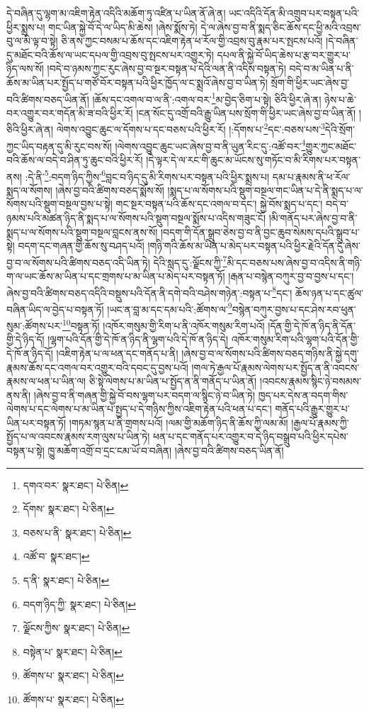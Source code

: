 དེ་བཞིན་དུ་ལྷག་མ་འཇིག་རྟེན་འདིའི་མཆོག་ཏུ་འཛིན་པ་ཡིན་ནོ་ཞེ་ན། ཡང་འདིའི་དོན་མི་འགྲུབ་པར་བསྟན་པའི་ཕྱིར་སྨྲས་པ། གང་ཡིན་སྐྱེ་བོ་དེ་ལ་ཡིད་མི་ཆེས། །ཞེས་སྨོས་ཏེ། དེ་ལ་ཞེས་བྱ་བ་ནི་སྨད་ཅིང་ཆོས་དང་ཕྱི་མའི་འབྲས་བུ་ལ་མི་ལྟ་བ་སྟེ། ཅི་ནས་ཀྱང་བསམ་པ་ཆོས་དང་འཇིག་རྟེན་ཕ་རོལ་གྱི་འབྲས་བུ་རྣམ་པར་སྤངས་པའོ། །དེ་བཞིན་དུ་མཐོང་བའི་ཆོས་ལ་ཡང་དཔལ་གྱི་འབྲས་བུ་སྤངས་པར་འགྱུར་ཏེ། དཔལ་ནི་སྐྱེ་བོ་ཡིད་ཆེས་པ་རྩ་བར་གྱུར་པ་ཉིད་ལས་སོ། །བདེ་བ་ཉམས་ཀྱང་རུང་ཞེས་བྱ་བ་སྔར་བསྟན་པ་དེའི་ལན་ནི་འདིས་བསྟན་ཏེ། བདེ་བ་མ་ཡིན་པ་ནི་ཆོས་མ་ཡིན་པར་སྤྱོད་པ་གཙོ་བོར་བསྟན་པའི་ཕྱིར་ཁྱོད་ལ་ང་སྨྲའོ་ཞེས་བྱ་བ་ཡིན་ཏེ། སྲོག་གི་ཕྱིར་ཡང་ཞེས་བྱ་བའི་ཚིགས་བཅད་ཡིན་ནོ། །ཆོས་དང་འགལ་བ་ལ་ནི་:འགལ་བར་\footnote{དགའ་བར་  སྣར་ཐང་།  པེ་ཅིན། }མ་བྱེད་ཅིག་པ་སྟེ། ཅིའི་ཕྱིར་ཞེ་ན། ཉེས་པ་ཆེ་བར་འགྱུར་བར་གདོན་མི་ཟ་བའི་ཕྱིར་རོ། །ངན་སོང་དུ་འགྲོ་བའི་རྒྱུ་ཡིན་པས་སྲོག་གི་ཕྱིར་ཡང་ཞེས་བྱ་བ་ཡིན་ནོ། །ཅིའི་ཕྱིར་ཞེ་ན། ལེགས་འབྱུང་ཆུང་ལ་དོགས་པ་དང་བཅས་པའི་ཕྱིར་རོ། །:དོགས་པ་\footnote{དོགས་  སྣར་ཐང་།  པེ་ཅིན། }དང་:བཅས་པས་\footnote{བཅས་པ་ནི་  སྣར་ཐང་།  པེ་ཅིན། }དེའི་སྲོག་ཀྱང་ཡིད་བརྟན་དུ་མི་རུང་བས་སོ། །ལེགས་འབྱུང་ཆུང་ཡང་ཞེས་བྱ་བ་ནི་ཡུན་རིང་དུ་:འཚོ་བར་\footnote{འཚོ་བ་  སྣར་ཐང་། }གྱུར་ཀྱང་མཐོང་བའི་ཆོས་ལ་བདེ་བ་ཤིན་ཏུ་ཆུང་བའི་ཕྱིར་རོ། །དེ་ལྟར་དེ་ལ་རང་གི་ཆུང་མ་ཡོངས་སུ་གཏོང་བ་མི་རིགས་པར་བསྟན་ནས། :དེ་ནི་\footnote{ད་ནི་  སྣར་ཐང་།  པེ་ཅིན། }:བདག་ཉིད་ཀྱིས་\footnote{བདག་ཉིད་ཀྱི་  སྣར་ཐང་།  པེ་ཅིན། }བླང་བ་ཉིད་དུ་མི་རིགས་པར་བསྟན་པའི་ཕྱིར་སྨྲས་པ། དམ་པ་རྣམས་ནི་ཕ་རོལ་སྨད་ལ་སོགས། །ཞེས་བྱ་བའི་ཚིགས་བཅད་སྨོས་སོ། །སྨད་པ་ལ་སོགས་པའི་སྡུག་བསྔལ་གང་ཡིན་པ་དེ་ནི་སྨད་པ་ལ་སོགས་པའི་སྡུག་བསྔལ་བྱས་པ་སྟེ། གང་སྔར་བསྟན་པའི་ཆོས་དང་འགལ་བ་དང་། སྐྱེ་བོས་སྨད་པ་དང་། བདེ་བ་ཉམས་པའི་མཚན་ཉིད་ནི་སྨད་པ་ལ་སོགས་པའི་སྡུག་བསྔལ་སྨོས་པ་འདིས་གཟུང་ངོ། །མི་གནོད་པར་ཞེས་བྱ་བ་ནི་སྨད་པ་ལ་སོགས་པའི་སྡུག་བསྔལ་བླངས་ནས་སོ། །བདག་གི་དོན་སྒྲུབ་ཅེས་བྱ་བ་ནི་བྱང་ཆུབ་སེམས་དཔའི་སྒྲུབ་པ་སྟེ། བདག་དང་གཞན་གྱི་ཆོས་སུ་བཤད་པའོ། །གཉི་གའི་ཆོས་མ་ཡིན་པ་མེད་པར་བསྟན་པའི་ཕྱིར་རྗེའི་དོན་དུ་ཞེས་བྱ་བ་ལ་སོགས་པའི་ཚིགས་བཅད་འདི་ཡིན་ཏེ། དེའི་སླད་དུ་:ལྗོངས་ཀྱི་\footnote{ལྗོངས་ཀྱིས་  སྣར་ཐང་།  པེ་ཅིན། }མི་དང་བཅས་པས་ཞེས་བྱ་བ་འདིས་ནི་གཉི་ག་ལ་ཡང་ཆོས་མ་ཡིན་པ་དང་གྲགས་པ་མ་ཡིན་པ་མེད་པར་བསྟན་ཏོ། །རྒན་པ་བསྙེན་བཀུར་བྱ་བ་བྱས་པ་དང་། ཞེས་བྱ་བའི་ཚིགས་བཅད་འདིའི་བསྡུས་པའི་དོན་ནི་དགེ་བའི་བཤེས་གཉེན་:བསྟན་པ་\footnote{བསྟེན་པ་  སྣར་ཐང་།  པེ་ཅིན། }དང་། ཆོས་ཉན་པ་དང་ཚུལ་བཞིན་ཡིད་ལ་བྱེད་པ་བསྟན་ཏོ། །ཡང་ན་བླ་མ་དང་དམ་པའི་:ཚོགས་ལ་\footnote{ཚོགས་པ་  སྣར་ཐང་།  པེ་ཅིན། }བསྙེན་བཀུར་བྱས་པ་དང་ཤེས་རབ་ཕུན་སུམ་:ཚོགས་པར་\footnote{ཚོགས་པ་  སྣར་ཐང་།  པེ་ཅིན། }བསྟན་ཏོ། །འཁོར་གསུམ་གྱི་རིག་པ་ནི་འཁོར་གསུམ་རིག་པའོ། །དོན་གྱི་དེ་ཁོ་ན་ཉིད་ནི་དོན་གྱི་དེ་ཉིད་དོ། །ལྷག་པའི་དོན་གྱི་དེ་ཁོ་ན་ཉིད་ནི་ལྷག་པའི་དེ་ཁོ་ན་ཉིད་དེ། འཁོར་གསུམ་རིག་པའི་ལྷག་པའི་དོན་གྱི་དེ་ཁོ་ན་ཉིད་དོ། །འཇིག་རྟེན་པ་ལ་ཕན་དང་གནོད་པ་ནི། །ཞེས་བྱ་བ་ལ་སོགས་པའི་ཚིགས་བཅད་གཉིས་ནི་སྐྱེ་དགུ་རྣམས་ཆོས་དང་འགལ་བར་འགྱུར་བའི་དབང་དུ་བྱས་པའོ། །གལ་ཏེ་རྒྱལ་པོ་རྣམས་ལེགས་པར་སྤྱོད་ན་ནི་འབངས་རྣམས་ལ་ཕན་པ་ཡིན་ལ། ཅི་སྟེ་ལེགས་པ་མ་ཡིན་པ་སྤྱོད་ན་ནི་གནོད་པ་ཡིན་ནོ། །འབངས་རྣམས་སྙིང་ཉེ་བསམས་ནས་ནི། །ཞེས་བྱ་བ་ནི་གཞན་གྱི་སྐྱེ་བོ་བས་ལྷག་པར་བདག་ལ་སྙིང་ཉེ་བ་ཡིན་ཏེ། ཁྱད་པར་དེས་ན་བདག་གིས་ལེགས་པ་དང་ལེགས་པ་མ་ཡིན་པ་སྤྱད་པ་དེ་གཉིས་ཀྱིས་འཇིག་རྟེན་པའི་ཕན་པ་དང་། གནོད་པའི་རྒྱུར་གྱུར་པ་ཡིན་པར་བསྟན་ཏོ། །གཏམ་སྙན་པ་ནི་གྲགས་པའོ། །ལམ་གྱི་མཆོག་ཉིད་ནི་ཆོས་ཀྱི་ལམ་མོ། །རྒྱལ་པོ་རྣམས་ཀྱི་སྤྱོད་པ་ལ་འབངས་རྣམས་རག་ལུས་པ་ཡིན་ཏེ། ཕན་པ་དང་གནོད་པར་འགྱུར་བ་དེ་ཉིད་བསྒྲུབ་པའི་ཕྱིར་དཔེས་བསྟན་པ་སྟེ། ཁྱུ་མཆོག་འགྲོ་བ་དྲང་ངམ་ཡོ་བ་བཞིན། །ཞེས་བྱ་བའི་ཚིགས་བཅད་ཡིན་ནོ། 